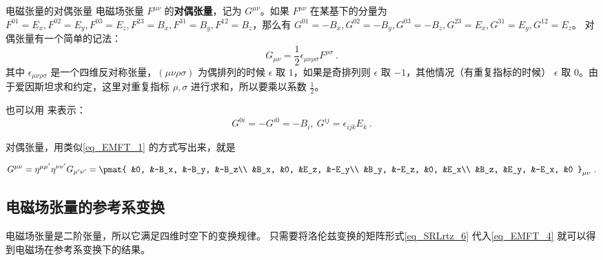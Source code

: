 \begin{definition}{电磁张量的对偶张量}
电磁场张量 $F^{\mu\nu}$ 的\textbf{对偶张量}，记为 $G^{\mu\nu}$。如果 $F^{\mu\nu}$ 在某基下的分量为 $F^{01}=E_x, F^{02}=E_y, F^{03}=E_z, F^{23}=B_x, F^{31}=B_y, F^{12}=B_z$，那么有 $G^{01}=-B_x, G^{02}=-B_y, G^{03}=-B_z, G^{23}=E_x, G^{31}=E_y, G^{12}=E_z$。
对偶张量有一个简单的记法：
\begin{equation}
G_{\mu\nu}=\frac{1}{2}\epsilon_{\mu\nu\rho\sigma}F^{\rho\sigma}~.
\end{equation}
其中 $\epsilon_{\mu\nu\rho\sigma}$ 是一个四维反对称张量，$(\mu\nu\rho\sigma)$ 为偶排列的时候 $\epsilon$ 取 $1$，如果是奇排列则 $\epsilon$ 取 $-1$，其他情况（有重复指标的时候） $\epsilon$ 取 $0$。由于爱因斯坦求和约定，这里对重复指标 $\rho,\sigma$ 进行求和，所以要乘以系数 $\frac{1}{2}$。

也可以用 来表示：
\begin{equation}
G^{0i}=-G^{i0}=-B_i,\ G^{ij}=\epsilon_{ijk}E_k~.
\end{equation}
\end{definition}

对偶张量，用类似\autoref{eq_EMFT_1} 的方式写出来，就是

\begin{equation}
\begin{aligned}
G^{\mu\nu}=\eta^{\mu\mu'}\eta^{\nu\nu'}G_{\mu'\nu'}=
\pmat{
&0, &-B_x, &-B_y, &-B_z\\ 
&B_x, &0, &E_z, &-E_y\\ 
&B_y, &-E_z, &0, &E_x\\
&B_z, &E_y, &-E_x, &0
}_{\mu\nu}~.
\end{aligned}
\end{equation}

\subsection{电磁场张量的参考系变换}
电磁场张量是二阶张量，所以它满足四维时空下的变换规律。
只需要将洛伦兹变换的矩阵形式\autoref{eq_SRLrtz_6}  代入\autoref{eq_EMFT_4} 就可以得到电磁场在参考系变换下的结果。

